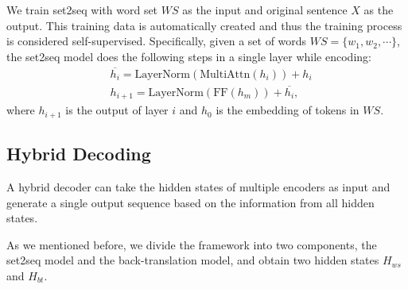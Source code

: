We train set2seq with word set $WS$ as the input and original sentence 
$X$ as the output. This training data is automatically created and thus
the training process is considered self-supervised.
Specifically, given a set of words $WS = \{w_1, w_2,\cdots\}$, the set2seq model does the following steps in a single layer while encoding:
\begin{align}
& \overline{h_{i}} = \text{LayerNorm}(\text{MultiAttn}(h_{i})) + h_{i} \\
& h_{i+1} = \text{LayerNorm}(\text{FF}(h_{m})) + \overline{h_{i}},
\end{align}
where $h_{i+1}$ is the output of layer $i$ and $h_0$ is the embedding of tokens in $WS$.



\subsection{Hybrid Decoding}\label{sec:joint}
A hybrid decoder can take the hidden states of multiple encoders as input and generate a single output sequence based on the information from all hidden states.

As we mentioned before, we divide the framework into two components, the set2seq model and the back-translation model, and obtain two hidden states $H_{ws}$ and $H_{bt}$. 


